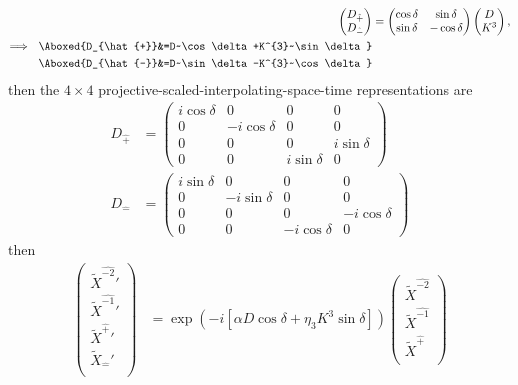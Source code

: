 \documentclass[]{article}
\numberwithin{equation}{section}
\begin{document}
{{\begin{align}
\begin{pmatrix}
    D_{\hat{+}}\\
    D_{\hat{-}}
  \end{pmatrix}&=
  \begin{pmatrix}
    \cos\delta   & \sin\delta \\
    \sin\delta   & -\cos\delta
  \end{pmatrix}
  \begin{pmatrix}
    D\\
    K^{3}
  \end{pmatrix},\\
\Longrightarrow~~\Aboxed{D_{\hat{+}}&=D~\cos\delta+K^{3}~\sin\delta}\\
\Aboxed{D_{\hat{-}}&=D~\sin\delta-K^{3}~\cos\delta}
\end{align}
then the $4\times4$ projective-scaled-interpolating-space-time representations are
\begin{align}
    D_{\hat{+}}&=\begin{pmatrix}
        i\cos\delta&0&0&0\\
        0&-i\cos\delta&0&0\\
        0&0&0&i\sin\delta\\
        0&0&i\sin\delta&0
    \end{pmatrix}\\
     D_{\hat{-}}&=\begin{pmatrix}
        i\sin\delta&0&0&0\\
        0&-i\sin\delta&0&0\\
        0&0&0&-i\cos\delta\\
        0&0&-i\cos\delta&0
    \end{pmatrix}
\end{align}
then
\begin{align}
\begin{pmatrix}
    \tilde{X}^{\hat{-2}}'\\
    \tilde{X}^{\hat{-1}}'\\
    \tilde{X}^{\hat{+}}'\\
    \tilde{X}_{\hat{-}}'\\
    \end{pmatrix}&= \exp{(-i[\alpha D\cos\delta+\eta_{3}K^{3}\sin\delta] )}\begin{pmatrix}
    \tilde{X}^{\hat{-2}}\\
    \tilde{X}^{\hat{-1}}\\
    \tilde{X}^{\hat{+}}\\

\end{pmatrix}
\end{align}}}
\end{document}
